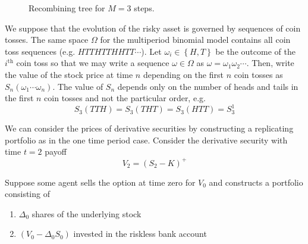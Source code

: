 \documentclass[12pt]{article}
\newlength\tindent
\renewcommand{\indent}{\hspace*{\tindent}}
\begin{document}
\begin{figure}[H]
\caption{Recombining tree for $M = 3$ steps.}
\end{figure}

\indent We suppose that the evolution of the risky asset is governed by sequences of coin tosses. The same space $\Omega$ for the multiperiod binomial model contains all coin toss sequences (e.g. $HTTHTTHHTT\cdots$). Let $\omega_i \in  \left\{ H, T \right\}$ be the outcome of the $i^{\text{th}}$ coin toss so that we may write a sequence $\omega \in \Omega$ as $\omega = \omega_1\omega_2\cdots$. Then, write the value of the stock price at time $n$ depending on the first $n$ coin tosses as $S_n(\omega_1\cdots\omega_n)$. The value of $S_n$ depends only on the number of heads and tails in the first $n$ coin tosses and not the particular order, e.g.
\begin{equation*}
	S_3(TTH) = S_3(THT) = S_3(HTT) = S^1_3
\end{equation*}

\indent We can consider the prices of derivative securities by constructing a replicating portfolio as in the one time period case. Consider the derivative security with time $t = 2$ payoff
\begin{equation*}
	V_2 = (S_2 - K)^+
\end{equation*}

\indent Suppose some agent sells the option at time zero for $V_0$ and constructs a portfolio consisting of
\begin{enumerate}[]
	\item $\Delta_0$ shares of the underlying stock 
	\item $(V_0 - \Delta_0S_0)$ invested in the riskless bank account
\end{enumerate}
\end{document}

